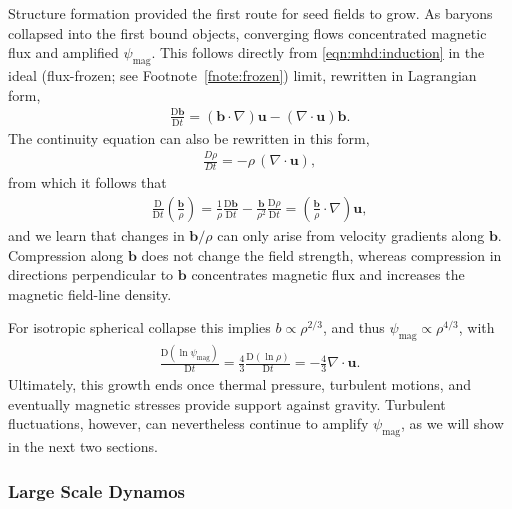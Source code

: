 \documentclass[12pt,twoside]{extreport}
\newcommand{\rbrac}[1]{\left( #1 \right)} %
\newcommand{\rfrac}[2]{\left( \frac{#1}{#2} \right)} %
\newcommand{\mVector}[1]{\bm{#1}} %
\newcommand{\mDD}[1]{\mathrm{D} #1}
\newcommand{\mDDFrac}[2]{\frac{\mDD{#1}}{\mDD{#2}}}
\begin{document}
Structure formation provided the first route for seed fields to grow. As baryons collapsed into the first bound objects, converging flows concentrated magnetic flux and amplified $\psi_\mathrm{mag}$. This follows directly from \autoref{eqn:mhd:induction} in the ideal (flux-frozen; see Footnote~\ref{fnote:frozen}) limit, rewritten in Lagrangian form,
\begin{align}
    \mDDFrac{\mVector{b}}{t}
        = (\mVector{b}\cdot\nabla) \mVector{u}
            - (\nabla\cdot\mVector{u}) \mVector{b}
    .
\end{align}
The continuity equation can also be rewritten in this form,
\begin{align}
    \frac{D\rho}{Dt}
        = -\rho \, (\nabla\cdot\mVector{u})
    ,
\end{align}
from which it follows that
\begin{align}
    \mDDFrac{}{t} \rfrac{\mVector{b}}{\rho}
        = \frac{1}{\rho} \mDDFrac{\mVector{b}}{t}
            - \frac{\mVector{b}}{\rho^2} \mDDFrac{\rho}{t}
        = \rbrac{\frac{\mVector{b}}{\rho}\cdot\nabla} \mVector{u}
    ,
\end{align}
and we learn that changes in $\mVector{b} / \rho$ can only arise from velocity gradients along $\mVector{b}$. Compression along $\mVector{b}$ does not change the field strength, whereas compression in directions perpendicular to $\mVector{b}$ concentrates magnetic flux and increases the magnetic field-line density.

For isotropic spherical collapse this implies $b \propto \rho^{2/3}$, and thus $\psi_\mathrm{mag} \propto \rho^{4/3}$, with
\begin{align}
    \mDDFrac{(\ln\psi_\mathrm{mag})}{t}
        = \frac{4}{3} \mDDFrac{(\ln\rho)}{t}
        = -\frac{4}{3} \nabla\cdot\mVector{u}
    .
\end{align}
Ultimately, this growth ends once thermal pressure, turbulent motions, and eventually magnetic stresses provide support against gravity. Turbulent fluctuations, however, can nevertheless continue to amplify $\psi_\mathrm{mag}$, as we will show in the next two sections.

\subsubsection{Large Scale Dynamos}
\label{sec:evolve:lsd}
\end{document}
